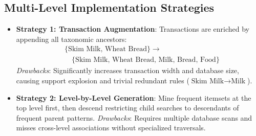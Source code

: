 \subsection{Multi-Level Implementation Strategies}
\begin{itemize}
    \item \textbf{Strategy 1: Transaction Augmentation}: Transactions are enriched by appending all taxonomic ancestors:
    \begin{equation}
    \begin{split}
    &\{\text{Skim Milk, Wheat Bread}\} \longrightarrow \\
    &\quad \{\text{Skim Milk, Wheat Bread, Milk, Bread, Food}\}
    \end{split}
    \end{equation}
    \textit{Drawbacks}: Significantly increases transaction width and database size, causing support explosion and trivial redundant rules ($\text{Skim Milk} \rightarrow \text{Milk}$).
    \item \textbf{Strategy 2: Level-by-Level Generation}: Mine frequent itemsets at the top level first, then descend restricting child searches to descendants of frequent parent patterns.
    \textit{Drawbacks}: Requires multiple database scans and misses cross-level associations without specialized traversals.
\end{itemize}
